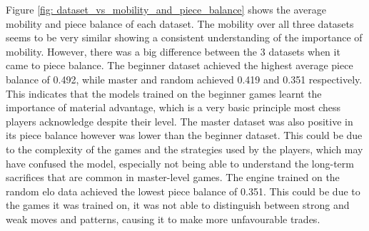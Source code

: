 Figure \ref{fig: dataset_vs_mobility_and_piece_balance} shows the average mobility and piece balance of each dataset. The mobility over all three datasets seems to be very similar showing a consistent understanding of the importance of mobility. However, there was a big difference between the 3 datasets when it came to piece balance. The beginner dataset achieved the highest average piece balance of 0.492, while master and random achieved 0.419 and 0.351 respectively. This indicates that the models trained on the beginner games learnt the importance of material advantage, which is a very basic principle most chess players acknowledge despite their level. The master dataset was also positive in its piece balance however was lower than the beginner dataset. This could be due to the complexity of the games and the strategies used by the players, which may have confused the model, especially not being able to understand the long-term sacrifices that are common in master-level games. The engine trained on the random elo data achieved the lowest piece balance of 0.351. This could be due to the games it was trained on, it was not able to distinguish between strong and weak moves and patterns, causing it to make more unfavourable trades. 






